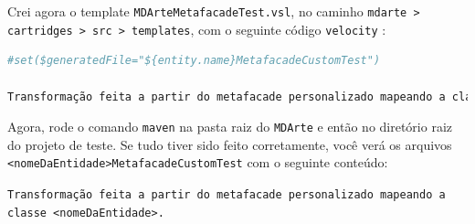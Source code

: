 Crei agora o template \texttt{MDArteMetafacadeTest.vsl}, no caminho
\texttt{mdarte > cartridges > src > templates}, com o seguinte código
\texttt{velocity} :

\begin{lstlisting}[language=bash]
#set($generatedFile="${entity.name}MetafacadeCustomTest")

Transformação feita a partir do metafacade personalizado mapeando a classe ${entity.name}.
\end{lstlisting}

Agora, rode o comando \texttt{maven} na pasta raiz do \texttt{MDArte} e então no
diretório raiz do projeto de teste. Se tudo tiver sido feito corretamente, você
verá os arquivos \texttt{<nomeDaEntidade>MetafacadeCustomTest} com o seguinte
conteúdo:

\texttt{Transformação feita a partir do metafacade personalizado mapeando a
classe <nomeDaEntidade>.}